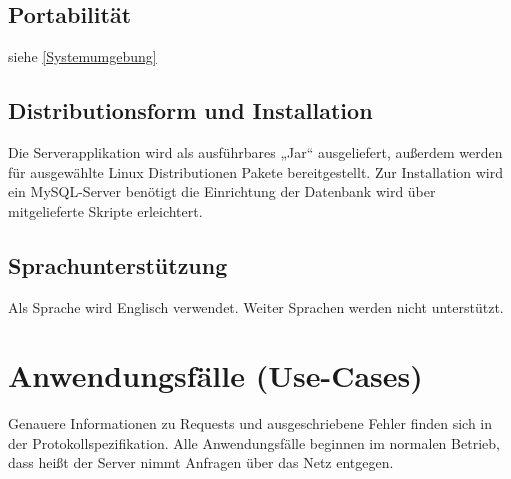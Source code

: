 \documentclass[a4paper,10pt,titlepage,parskip=true]{article}
\makeatletter
\newcommand\novspace{\@minipagetrue}
\newenvironment{owncompactitem}{%
\compactitem
}{%
\@finalstrut\@arstrutbox
\@nameuse{endcompactitem}%
\aftergroup\let\aftergroup\@finalstrut\aftergroup\@gobble
}
\newenvironment{owncompactenum}{%
\compactenum
}{%
\@finalstrut\@arstrutbox
\@nameuse{endcompactenum}%
\aftergroup\let\aftergroup\@finalstrut\aftergroup\@gobble
}
\newcommand{\usecase}[7]
{\subsection{#1}
\setlength{\extrarowheight}{2pt}
\begin{tabular}{|p{0.2\textwidth}|p{0.9\textwidth}|}
\hline
  Akteure & #2\\\hline
  Ziel & #3\\\hline
  Vorbedingungen & \novspace
  	\begin{owncompactitem}[-] #4 \end{owncompactitem} \\\hline
  Normalablauf & \vspace{-7pt}
  	\begin{owncompactenum}[1.] #6 \end{owncompactenum} \\\hline
  Nachbedingungen & \novspace
  	\begin{owncompactitem}[-] #5 \end{owncompactitem} \\\hline
  #7
\end{tabular}
}
\newcommand{\sonderfall}[4][\empty]
{
Sonderfall #2 & \vspace{-10pt}
	\textit{#3}
	\begin{owncompactenum}[{#2}.1] {#4} \end{owncompactenum}
  	\ifthenelse{\equal{#1}{\empty}}
    	{\\\hline} %
    	{\ensuremath{\rightarrow} #1 \\ [+1pt] \hline} %

}
\newcommand{\kurzersonderfall}[3][\empty]
{
Sonderfall #2 & \vspace{-10pt}
	\textit{#3}
  	\ifthenelse{\equal{#1}{\empty}}
    	{\\\hline} %
    	{\\&\ensuremath{\rightarrow} #1 \\ [+1pt] \hline} %

}
\newcommand{\sondernachbedingung}[1]
{
Nachbedingungen im Sonderfall& \novspace
	\begin{owncompactitem}[-]
		#1
	\end{owncompactitem} \\\hline
}
\makeatother
\begin{document}
\subsection{Portabilität}
siehe \ref{Systemumgebung}
\subsection{Distributionsform und Installation}
Die Serverapplikation wird als ausführbares „Jar“ ausgeliefert, außerdem werden für ausgewählte Linux Distributionen Pakete bereitgestellt. Zur Installation wird ein MySQL-Server benötigt die Einrichtung der Datenbank wird über mitgelieferte Skripte erleichtert.
\subsection{Sprachunterstützung}
Als Sprache wird Englisch verwendet. Weiter Sprachen werden nicht unterstützt.

\clearpage
\section{Anwendungsfälle (Use-Cases)}
Genauere Informationen zu Requests und ausgeschriebene Fehler finden sich in der Protokollspezifikation. Alle Anwendungsfälle beginnen im normalen Betrieb, dass heißt der Server nimmt Anfragen über das Netz entgegen.




{%
}{%
}{%
}{%
}{%
}

{%
}{%
}

{%
}
\end{document}
